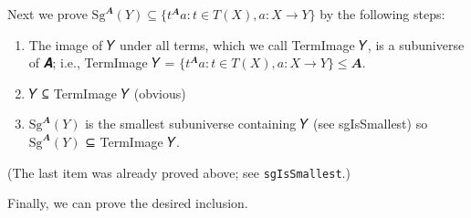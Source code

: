 \documentclass[sigplan,screen]{acmart}
\begin{document}
Next we prove \(\mathrm{Sg}^𝑨(Y) ⊆ \{ t^𝑨 a : t ∈ 𝑇(𝑋), a : 𝑋 → 𝑌 \}\) by the following steps:
\begin{enumerate}
\item The image of 𝑌 under all terms, which we call TermImage 𝑌, is a subuniverse of 𝑨; i.e., TermImage 𝑌 =
  \(\{ t^𝑨 a : t ∈ 𝑇(𝑋), a : 𝑋 → 𝑌 \} ≤ 𝑨\).
\item 𝑌 ⊆ TermImage 𝑌 (obvious)
\item \(\mathrm{Sg}^𝑨(Y)\) is the smallest subuniverse containing 𝑌 (see sgIsSmallest) so \(\mathrm{Sg}^𝑨(Y)\) ⊆ TermImage 𝑌.
\end{enumerate}
\noindent (The last item was already proved above; see \texttt{sgIsSmallest}.)
\begin{code}\end{code}
Finally, we can prove the desired inclusion.
\begin{code}
\\[\AgdaEmptyExtraSkip]%
\>[1]\AgdaSpace{}%
\AgdaSymbol{:}\AgdaSpace{}%
\AgdaSymbol{(}\AgdaSpace{}%
\AgdaSymbol{:}\AgdaSpace{}%
\AgdaSpace{}%
\AgdaSpace{}%
\AgdaSpace{}%
\AgdaSpace{}%
\AgdaSymbol{)}\AgdaSpace{}%
\AgdaSpace{}%
\AgdaSpace{}%
\AgdaSpace{}%
\AgdaSpace{}%
\AgdaSpace{}%
\<%
\\
%
\>[1]\AgdaSpace{}%
\AgdaSpace{}%
\AgdaSymbol{=}\AgdaSpace{}%
%
\>[775I]\AgdaSymbol{(}\AgdaSpace{}%
\AgdaSymbol{)}\<%
\\
\>[.][@{}l@{}]\<[775I]%
\>[33]\AgdaSymbol{(}\AgdaSpace{}%
\AgdaSymbol{)}\<%
\end{code}
\end{document}
